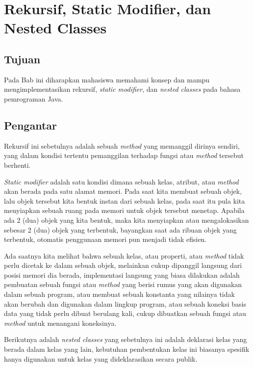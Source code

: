 \chapter{Rekursif, Static Modifier, dan Nested Classes}

\section{Tujuan}

Pada Bab ini diharapkan mahasiswa memahami konsep dan mampu mengimplementasikan rekursif, \textit{static modifier}, dan \textit{nested classes} pada bahasa pemrograman Java.

\section{Pengantar}

Rekursif ini sebetulnya adalah sebuah \textit{method} yang memanggil dirinya sendiri, yang dalam kondisi tertentu pemanggilan terhadap fungsi atau \textit{method} tersebut berhenti.

\textit{Static modifier} adalah satu kondisi dimana sebuah kelas, atribut, atau \textit{method} akan berada pada satu alamat memori. Pada saat kita membuat sebuah objek, lalu objek tersebut kita bentuk instan dari sebuah kelas, pada saat itu pula kita menyiapkan sebuah ruang pada memori untuk objek tersebut menetap. Apabila ada 2 (dua) objek yang kita bentuk, maka kita menyiapkan atau mengalokasikan sebesar 2 (dua) objek yang terbentuk, bayangkan saat ada ribuan objek yang terbentuk, otomatis penggunaan memori pun menjadi tidak efisien.

Ada saatnya kita melihat bahwa sebuah kelas, atau properti, atau \textit{method} tidak perlu dicetak ke dalam sebuah objek, melainkan cukup dipanggil langsung dari posisi memori dia berada, implementasi langsung yang biasa dilakukan adalah pembuatan sebuah fungsi atau \textit{method} yang berisi rumus yang akan digunakan dalam sebuah program, atau membuat sebuah konstanta yang nilainya tidak akan berubah dan digunakan dalam lingkup program, atau sebuah koneksi basis data yang tidak perlu dibuat berulang kali, cukup dibuatkan sebuah fungsi atau \textit{method} untuk menangani koneksinya.

Berikutnya adalah \textit{nested classes} yang sebetulnya ini adalah deklarasi kelas yang berada dalam kelas yang lain, kebutuhan pembentukan kelas ini biasanya spesifik hanya digunakan untuk kelas yang dideklarasikan secara publik.

